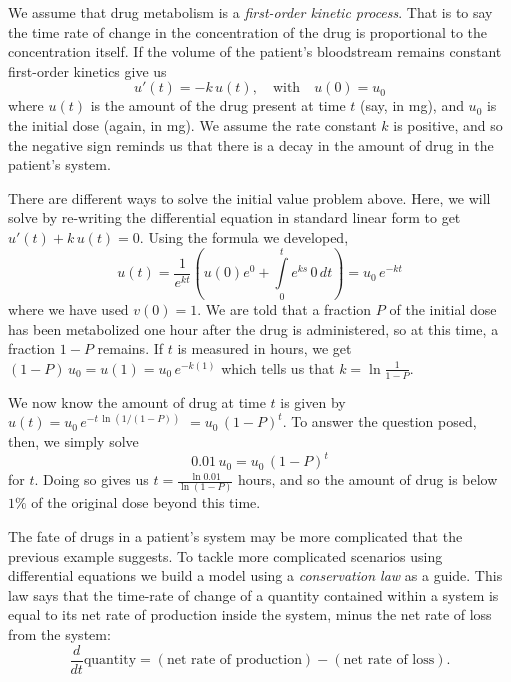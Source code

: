 \documentclass[../book.tex]{subfiles}
\begin{document}
\begin{solution}
We assume that drug metabolism is a \emph{first-order kinetic process}. That is to say the time rate of change in the concentration of the drug is proportional to the concentration itself. If the volume of the patient's bloodstream remains constant first-order kinetics give us
\begin{equation}\label{eq:de-27}
u'(t) = - k\, u(t), \quad \text{with} \quad u(0) = u_0
\end{equation}
where \(u(t)\) is the amount of the drug present at time \(t\) (say, in mg), and \(u_0\) is the initial dose (again, in mg). We assume the rate constant \(k\) is positive, and so the negative sign reminds us that there is a decay in the amount of drug in the patient's system.

There are different ways to solve the initial value problem above. Here, we will solve by re-writing the differential equation in standard linear form to get \(u'(t) + k\, u(t) = 0\). Using the formula we developed,
\begin{equation}\label{eq:de-28}
u(t) = \frac{1}{e^{kt}} \left( u(0) e^0 +  \int\limits_0^t e^{ks}\, 0 \, dt \right) = u_0 \, e^{-kt} 
\end{equation}
where we have used \(v(0)=1\). We are told that a fraction \(P\) of the initial dose has been metabolized one hour after the drug is administered, so at this time, a fraction \(1-P\) remains. If \(t\) is measured in hours, we get \((1-P)\, u_0 = u(1) = u_0 \, e^{-k(1)}\) which tells us that \(k = \ln \frac{1}{1-P}\).

We now know the amount of drug at time \(t\) is given by \(u(t) = u_0 \, e^{- t \, \ln (1/(1-P))}\) \(= u_0 \, (1-P)^t\). To answer the question posed, then, we simply solve
\begin{equation}\label{eq:de-29}
0.01\, u_0 = u_0 \, (1-P)^t
\end{equation}
for \(t\). Doing so gives us \(t = \frac{ \ln 0.01 }{\ln (1-P)}\) hours, and so the amount of drug is below \(1\%\) of the original dose beyond this time.
\end{solution}

The fate of drugs in a patient's system may be more complicated that the previous example suggests. To tackle more complicated scenarios using differential equations we build a model using a \emph{conservation law} as a guide. This law says that the time-rate of change of a quantity contained within a system is equal to its net rate of production inside the system, minus the net rate of loss from the system:
\begin{equation}\label{eq:de-30}
\frac{d}{dt} \text{quantity} = (\text{net rate of production}) - (\text{net rate of loss}).
\end{equation}
\end{document}
